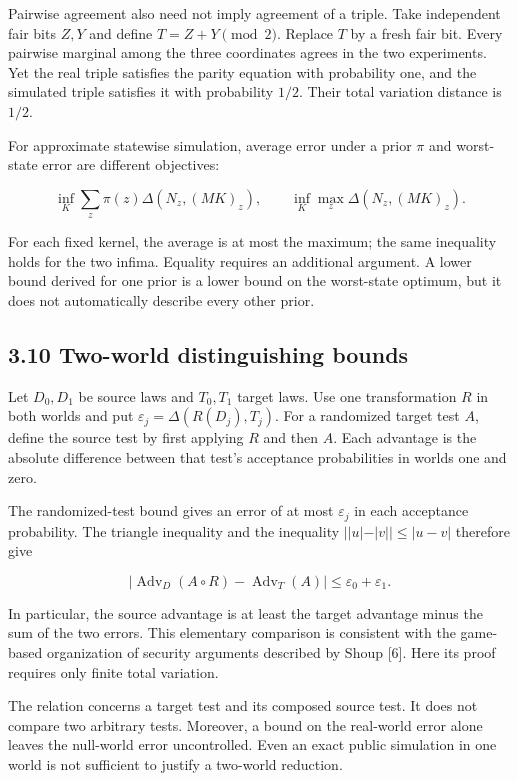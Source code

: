 \documentclass[
]{article}
\begin{document}
Pairwise agreement also need not imply agreement of a triple. Take
independent fair bits \(Z,Y\) and define \(T=Z+Y\pmod2\). Replace \(T\)
by a fresh fair bit. Every pairwise marginal among the three coordinates
agrees in the two experiments. Yet the real triple satisfies the parity
equation with probability one, and the simulated triple satisfies it
with probability \(1/2\). Their total variation distance is \(1/2\).

For approximate statewise simulation, average error under a prior
\(\pi\) and worst-state error are different objectives:

\[
\inf_K\sum_z\pi(z)\Delta(N_z,(MK)_z),
\qquad
\inf_K\max_z\Delta(N_z,(MK)_z).
\]

For each fixed kernel, the average is at most the maximum; the same
inequality holds for the two infima. Equality requires an additional
argument. A lower bound derived for one prior is a lower bound on the
worst-state optimum, but it does not automatically describe every other
prior.

\subsection{3.10 Two-world distinguishing
bounds}\label{two-world-distinguishing-bounds}

Let \(D_0,D_1\) be source laws and \(T_0,T_1\) target laws. Use one
transformation \(R\) in both worlds and put
\(\varepsilon_j=\Delta(R(D_j),T_j)\). For a randomized target test
\(A\), define the source test by first applying \(R\) and then \(A\).
Each advantage is the absolute difference between that test's acceptance
probabilities in worlds one and zero.

The randomized-test bound gives an error of at most \(\varepsilon_j\) in
each acceptance probability. The triangle inequality and the inequality
\(||u|-|v||\le|u-v|\) therefore give

\[
\left|\operatorname{Adv}_{D}(A\circ R)-\operatorname{Adv}_{T}(A)\right|
\le\varepsilon_0+\varepsilon_1.
\]

In particular, the source advantage is at least the target advantage
minus the sum of the two errors. This elementary comparison is
consistent with the game-based organization of security arguments
described by Shoup {[}6{]}. Here its proof requires only finite total
variation.

The relation concerns a target test and its composed source test. It
does not compare two arbitrary tests. Moreover, a bound on the
real-world error alone leaves the null-world error uncontrolled. Even an
exact public simulation in one world is not sufficient to justify a
two-world reduction.
\end{document}
